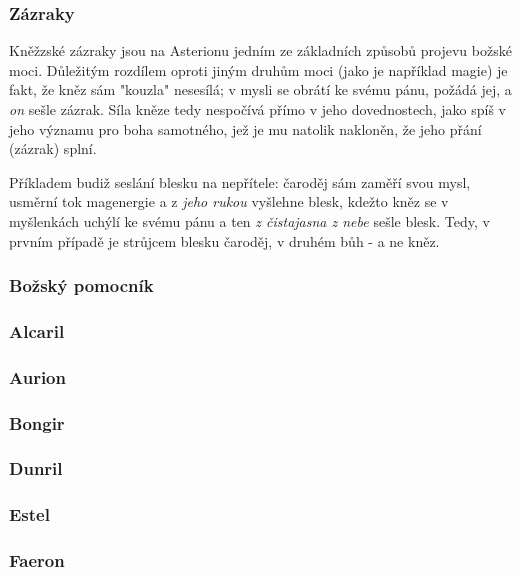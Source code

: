 \documentclass[../main.tex]{subfiles}
\begin{document}
\subsubsection{Zázraky}
\label{sec:zazraky}
Kněžzské zázraky jsou na Asterionu jedním ze základních způsobů projevu božské moci. Důležitým rozdílem oproti jiným druhům moci (jako je například magie) je fakt, že kněz sám "kouzla" nesesílá; v mysli se obrátí ke svému pánu, požádá jej, a \emph{on} sešle zázrak. Síla kněze tedy nespočívá přímo v jeho dovednostech, jako spíš v jeho významu pro boha samotného, jež je mu natolik nakloněn, že jeho přání (zázrak) splní. 
\begin{example}
	Příkladem budiž seslání blesku na nepřítele: čaroděj sám zaměří svou mysl, usměrní tok magenergie a z \emph{jeho rukou} vyšlehne blesk, kdežto kněz se v myšlenkách uchýlí ke svému pánu a ten \emph{z čistajasna z nebe} sešle blesk. Tedy, v prvním případě je strůjcem blesku čaroděj, v druhém bůh - a ne kněz.
\end{example}
\subsubsection*{Božský pomocník}
\label{sec:bozsky-pomocnik}

\subsubsection{Alcaril}
\label{sec:alcaril}

\subsubsection{Aurion}
\label{sec:aurion}

\subsubsection{Bongir}
\label{sec:bongir}

\subsubsection{Dunril}
\label{sec:dunril}

\subsubsection{Estel}
\label{sec:estel}

\subsubsection{Faeron}
\label{sec:faeron}
\end{document}
